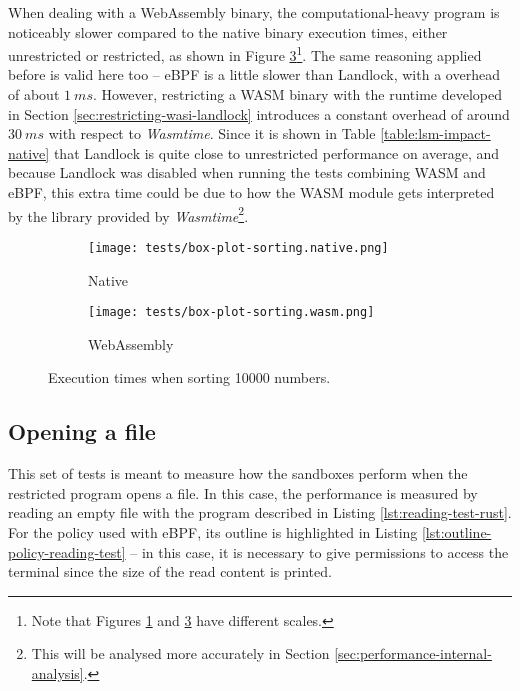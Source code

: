 When dealing with a WebAssembly binary, the computational-heavy program is noticeably slower
compared to the native binary execution times, either unrestricted or restricted, as shown in Figure
\ref{fig:distribution-sorting-wasm}\footnote{Note that Figures \ref{fig:distribution-sorting-native} and \ref{fig:distribution-sorting-wasm}
have different scales.}.
The same reasoning applied before is valid here too -- eBPF is a little slower than Landlock, with a overhead
of about $1\ ms$.
However, restricting a WASM binary with the runtime developed in Section \ref{sec:restricting-wasi-landlock}
introduces a constant overhead of around $30\ ms$ with respect to \textit{Wasmtime}.
Since it is shown in Table \ref{table:lsm-impact-native} that Landlock is quite close to
unrestricted performance on average, and because Landlock was disabled when running
the tests combining WASM and eBPF, this extra time could be due to how the WASM module gets
interpreted by the library provided by \textit{Wasmtime}\footnote{This will be analysed more
accurately in Section \ref{sec:performance-internal-analysis}.}.

\begin{figure}[ht]
  \centering
  \begin{subfigure}[b]{0.49\textwidth}
    \centering
    \texttt{[image: tests/box-plot-sorting.native.png]}
    \caption{Native}
    \label{fig:distribution-sorting-native}
  \end{subfigure}
  \begin{subfigure}[b]{0.49\linewidth}
    \centering
    \texttt{[image: tests/box-plot-sorting.wasm.png]}
    \caption{WebAssembly}
    \label{fig:distribution-sorting-wasm}
  \end{subfigure}
  \caption{Execution times when sorting 10000 numbers.}
\end{figure}

\clearpage

\subsection{Opening a file}

This set of tests is meant to measure how the sandboxes perform when the restricted program opens a file.
In this case, the performance is measured by reading an empty file with the program described in Listing \ref{lst:reading-test-rust}.
For the policy used with eBPF, its outline is highlighted in Listing \ref{lst:outline-policy-reading-test}
-- in this case, it is necessary to give permissions to access the terminal since the size of the read content is printed. 


